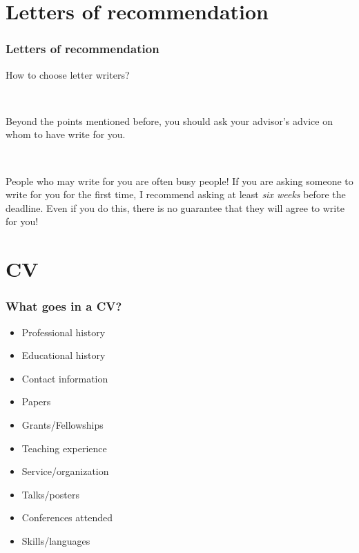 \documentclass{beamer}
\begin{document}
\section{Letters of recommendation}

\begin{frame}\frametitle{Letters of recommendation}

How to choose letter writers?

\

Beyond the points mentioned before, you should ask your advisor's advice on whom to have write for you. 


\


People who may write for you are often busy people! If you are asking someone to write for you for the first time, I recommend asking at least \emph{six weeks} before the deadline. Even if you do this, there is no guarantee that they will agree to write for you!

\end{frame}

\section{CV}

\begin{frame}\frametitle{What goes in a CV?}

\begin{itemize}
	\item Professional history
	\item Educational history
	\item Contact information
	\item Papers
	\item Grants/Fellowships
	\item Teaching experience
	\item Service/organization
	\item Talks/posters
	\item Conferences attended
	\item Skills/languages
\end{itemize}

\end{frame}
\end{document}

